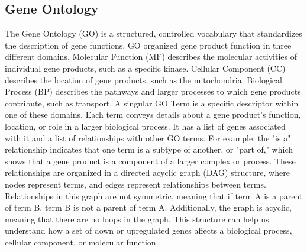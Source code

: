 \documentclass{article}
\begin{document}
    \subsection{Gene Ontology}\label{subsec:gene-ontology}
    The Gene Ontology (GO) is a structured, controlled vocabulary that standardizes the description of gene functions\cite{RN1}. GO organized gene product function in three different domains. Molecular Function (MF) describes the molecular activities of individual gene products, such as a specific kinase. Cellular Component (CC) describes the location of gene products, such as the mitochondria. Biological Process (BP) describes the pathways and larger processes to which gene products contribute, such as transport\cite{RN2}. A singular GO Term is a specific descriptor within one of these domains. Each term conveys details about a gene product’s function, location, or role in a larger biological process. It has a list of genes associated with it and a list of relationships with other GO terms. For example, the "is a" relationship indicates that one term is a subtype of another, or "part of," which shows that a gene product is a component of a larger complex or process\cite{RN1}. These relationships are organized in a directed acyclic graph (DAG) structure, where nodes represent terms, and edges represent relationships between terms. Relationships in this graph are not symmetric, meaning that if term A is a parent of term B, term B is not a parent of term A. Additionally, the graph is acyclic, meaning that there are no loops in the graph. This structure can help us understand how a set of down or upregulated genes affects a biological process, cellular component, or molecular function.
\end{document}
